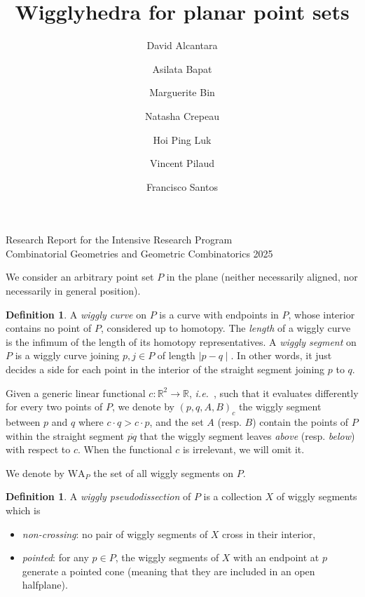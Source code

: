\documentclass{amsart}
\title{Wigglyhedra for planar point sets}
\author[D. Alcantara]{David Alcantara}
\author[A. Bapat]{Asilata Bapat}
\author[M. Bin]{Marguerite Bin}
\author[N. Crepeau]{Natasha Crepeau}
\author[H. Ping Luk]{Hoi Ping Luk}
\author[V. Pilaud]{Vincent Pilaud}
\author[F. Santos]{Francisco Santos}
\theoremstyle{definition}
\newtheorem{definition}[theorem]{Definition}
\newcommand{\R}{\mathbb{R}} %
\newcommand{\wigglyArcs}{\mathrm{WA}} %
\newcommand{\ie}{\textit{i.e.}~} %
\newcommand{\defn}[1]{\textsl{\color{darkblue} #1}} %
\begin{document}
\vspace*{-2cm}
\begin{center}
\small
Research Report for the Intensive Research Program \\ Combinatorial Geometries and Geometric Combinatorics 2025
\end{center}

\maketitle

We consider an arbitrary point set $P$ in the plane
(neither necessarily aligned, nor necessarily in general position).

\begin{definition}
    \label{def:wiggly-segment}
    A \defn{wiggly curve} on $P$ is a curve with endpoints in $P$, whose interior contains no point
    of $P$, considered up to homotopy.
    The \defn{length} of a wiggly curve is the infimum of the length of its homotopy representatives.
    A \defn{wiggly segment} on $P$ is a wiggly curve joining $p, j\in P$ of length $\mid p - q\mid$.
    In other words, it just decides a side for each point in the interior of the straight segment
    joining $p$ to $q$.
    
    Given a generic linear functional $c: \R^2 \to \R$, \ie, such that it evaluates differently
    for every two points of $P$, we denote by $(p, q, A, B)_c$ the wiggly segment between
    $p$ and $q$ where $c\cdot q > c\cdot p$, and the set $A$ (resp. $B$) contain the points of $P$
    within the straight segment $\overline{pq}$ that the wiggly segment leaves \emph{above}
    (resp. \emph{below}) with respect to $c$.
    When the functional $c$ is irrelevant, we will omit it.
\end{definition}

We denote by $\wigglyArcs_P$ the set of all wiggly segments on $P$.

\begin{definition}
    \label{def:wiggly-pseudodissection}
    A \defn{wiggly pseudodissection} of $P$ is a collection $X$ of wiggly segments which is
    \begin{itemize}
        \item \defn{non-crossing}: no pair of wiggly segments of $X$ cross in their interior,
        \item \defn{pointed}: for any $p\in P$, the wiggly segments of $X$ with an endpoint at
        $p$ generate a pointed cone (meaning that they are included in an open halfplane).
    \end{itemize}
\end{definition}
\end{document}
